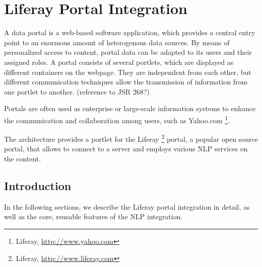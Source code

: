 %
%
%   
% 

\chapter{Liferay Portal Integration}
\label{chap:liferay}
A data portal is a web-based software application, which provides a central entry point to an enormous amount of heterogenous data sources. By means of personalized access to content, portal data can be adapted to its users and their assigned roles. A portal consists of several portlets, which are displayed as different containers on the webpage. They are independent from each other, but different communication techniques allow the transmission of information from one portlet to another. (reference to JSR 268?)

Portals are often used as enterprise or large-scale information systems to enhance the communication and collaboration among users, such as Yahoo.com \footnote{Liferay, \url{http://www.yahoo.com}}. 

The \sa architecture provides a portlet for the Liferay \footnote{Liferay, \url{http://www.liferay.com}} portal, a popular open source portal, that allows to connect to a \sa server and employs various NLP services on the content.

\section{Introduction}
In the following sections, we describe the Liferay portal integration in detail, as well as the core, reusable features of the NLP integration.

